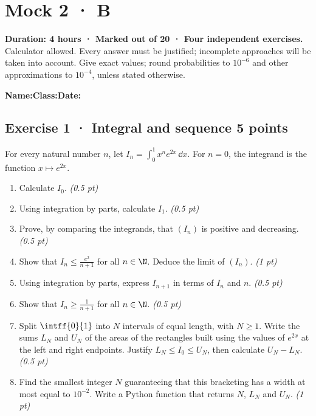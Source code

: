 \fi

\fi

\ifmxteacher

\mxnewpage{}\label{sujet:8-4}

\section*{Mock 2 · B}


\textbf{Duration: 4 hours · Marked out of 20 · Four independent exercises.}\\Calculator allowed. Every answer must be justified; incomplete approaches will be taken into account. Give exact values; round probabilities to $10^{-6}$ and other approximations to $10^{-4}$, unless stated otherwise.

\smallskip\textbf{Name:}\enspace\dotfill\quad\textbf{Class:}\enspace\dotfill\quad\textbf{Date:}\enspace\dotfill

\subsection*{Exercise 1 · Integral and sequence \hfill 5 points}For every natural number $n$, let $I_n=\displaystyle\int_0^1x^ne^{2x}\,\dd x$. For $n=0$, the integrand is the function $x\mapsto e^{2x}$.

\begin{enumerate}

\item Calculate $I_0$. \hfill\textit{(0.5 pt)}

\item Using integration by parts, calculate $I_1$. \hfill\textit{(0.5 pt)}

\item Prove, by comparing the integrands, that $(I_n)$ is positive and decreasing. \hfill\textit{(0.5 pt)}

\item Show that $I_n\le\frac{e^{2}}{n+1}$ for all $n\in\N$. Deduce the limit of $(I_n)$. \hfill\textit{(1 pt)}

\item Using integration by parts, express $I_{n+1}$ in terms of $I_n$ and $n$. \hfill\textit{(0.5 pt)}

\item Show that $I_n\ge\frac1{n+1}$ for all $n\in\N$. \hfill\textit{(0.5 pt)}

\item Split $\intff{0}{1}$ into $N$ intervals of equal length, with $N\ge1$. Write the sums $L_N$ and $U_N$ of the areas of the rectangles built using the values of $e^{2x}$ at the left and right endpoints. Justify $L_N\le I_0\le U_N$, then calculate $U_N-L_N$. \hfill\textit{(0.5 pt)}

\item Find the smallest integer $N$ guaranteeing that this bracketing has a width at most equal to $10^{-2}$. Write a Python function that returns $N$, $L_N$ and $U_N$. \hfill\textit{(1 pt)}

\end{enumerate}

